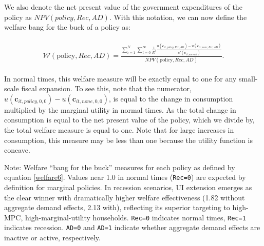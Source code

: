 \documentclass[qe,draft]{econsocart}
\theoremstyle{plain}
\theoremstyle{definition}
\begin{document}
We also denote the net present value of the government expenditures of the policy as $NPV(\textit{policy},Rec,AD)$.
With this notation, we can now define the welfare bang for the buck of a policy as:

\begin{equation}
  \begin{gathered}
    \begin{aligned}
      \label{welfare6}
      \mathcal{W}(\text{policy},Rec,AD) =\frac{\sum_{i=1}^{N} \sum_{t=0}^{\infty} \frac{1}{R^t} \frac{u(\mathbf{c}_{it,\textit{policy},Rec,AD}) - u(\mathbf{c}_{it,\textit{none},Rec,AD})}{ u'(\mathbf{c}_{it,\textit{normal}})}}{NPV(\text{policy},Rec,AD)}.
    \end{aligned}
  \end{gathered}
\end{equation}

In normal times, this welfare measure will be exactly equal to one for any small-scale fiscal expansion.
To see this, note that the numerator,  $u(\mathbf{c}_{it,\textit{policy},0,0}) - u(\mathbf{c}_{it,\textit{none},0,0})$, is equal to the change in consumption multiplied by the marginal utility in normal times.
As the total change in consumption is equal to the net present value of the policy, which we divide by, the total welfare measure is equal to one.
Note that for large increases in consumption, this measure may be less than one because the utility function is concave.

\begin{table}[tb] 
  \caption{\pregenmark Welfare effectiveness: policy ``bang for the buck'' comparison}
  \label{tab:welfare6}
  \centering


  \parbox{\textwidth}{
    \medskip
    \footnotesize Note: Welfare ``bang for the buck'' measures for each policy as defined by equation \eqref{welfare6}. Values near 1.0 in normal times (\texttt{Rec=0}) are expected by definition for marginal policies. In recession scenarios, UI extension emerges as the clear winner with dramatically higher welfare effectiveness (1.82 without aggregate demand effects, 2.13 with), reflecting its superior targeting to high-MPC, high-marginal-utility households. \texttt{Rec=0} indicates normal times, \texttt{Rec=1} indicates recession. \texttt{AD=0} and \texttt{AD=1} indicate whether aggregate demand effects are inactive or active, respectively.
  }

\end{table}
\end{document}
